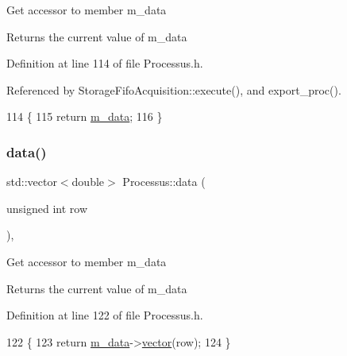 Get accessor to member m\+\_\+data \begin{DoxyReturn}{Returns}
the current value of m\+\_\+data 
\end{DoxyReturn}


Definition at line 114 of file Processus.\+h.



Referenced by Storage\+Fifo\+Acquisition\+::execute(), and export\+\_\+proc().


\begin{DoxyCode}
114               \{
115     \textcolor{keywordflow}{return} \hyperlink{classProcessus_a3da9a9de8af54e2f47807a3e09dfccff}{m\_data};
116   \}
\end{DoxyCode}
\mbox{\label{classProcessus_aa7c57483cf4b9ab0b2d0ae2de8316402}} 
\subsubsection{\texorpdfstring{data()}{data()}\hspace{0.1cm}{\footnotesize\ttfamily [2/3]}}
{\footnotesize\ttfamily std\+::vector$<$double$>$ Processus\+::data (\begin{DoxyParamCaption}\item[{unsigned int}]{row }\end{DoxyParamCaption})\hspace{0.3cm}{\ttfamily [inline]}, {\ttfamily [inherited]}}

Get accessor to member m\+\_\+data \begin{DoxyReturn}{Returns}
the current value of m\+\_\+data 
\end{DoxyReturn}


Definition at line 122 of file Processus.\+h.


\begin{DoxyCode}
122                                           \{
123     \textcolor{keywordflow}{return} \hyperlink{classProcessus_a3da9a9de8af54e2f47807a3e09dfccff}{m\_data}->\hyperlink{classData_a94e00cdd58c1d6f11487f1ac47fee4bc}{vector}(row);
124   \}
\end{DoxyCode}
\mbox{\label{classProcessus_abf4d91fb36707e1d50178bab12d21ae9}} 
